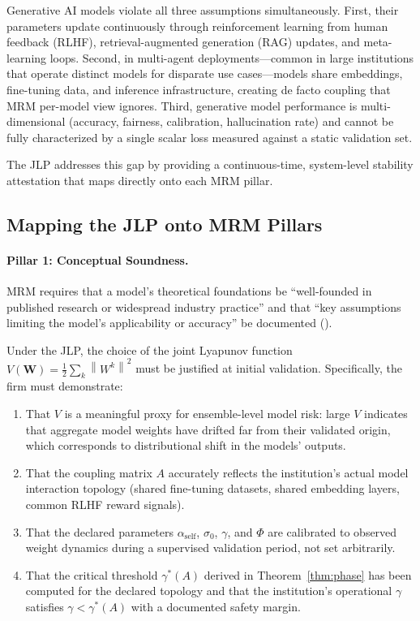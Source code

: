\documentclass[12pt]{article}
\theoremstyle{plain}
\theoremstyle{definition}
\newcommand{\W}{\mathbf{W}}
\newcommand{\norm}[1]{\left\lVert #1 \right\rVert}
\begin{document}
Generative AI models violate all three assumptions simultaneously.
First, their parameters update continuously through reinforcement
learning from human feedback (RLHF), retrieval-augmented generation
(RAG) updates, and meta-learning loops.  Second, in multi-agent
deployments---common in large institutions that operate distinct models for
disparate use cases---models
share embeddings, fine-tuning data, and inference infrastructure,
creating de facto coupling that MRM per-model view ignores.
Third, generative model performance is multi-dimensional (accuracy,
fairness, calibration, hallucination rate) and cannot be fully
characterized by a single scalar loss measured against a static
validation set.

The JLP addresses this gap by providing a continuous-time, system-level
stability attestation that maps directly onto each MRM pillar.

\subsection{Mapping the JLP onto MRM Pillars}

\paragraph{Pillar 1: Conceptual Soundness.}

MRM requires that a model's theoretical foundations be
``well-founded in published research or widespread industry practice''
and that ``key assumptions limiting the model's applicability or
accuracy'' be documented (\cite{sr117}).

Under the JLP, the choice of the joint Lyapunov function
$V(\W) = \tfrac{1}{2}\sum_k \norm{W^k}^2$ must be justified at
initial validation.  Specifically, the firm must demonstrate:

\begin{enumerate}[label=(\roman*)]
  \item That $V$ is a meaningful proxy for ensemble-level model risk:
    large $V$ indicates that aggregate model weights have drifted far
    from their validated origin, which corresponds to distributional
    shift in the models' outputs.

  \item That the coupling matrix $A$ accurately reflects the
    institution's actual model interaction topology (shared fine-tuning
    datasets, shared embedding layers, common RLHF reward signals).

  \item That the declared parameters $\alpha_{\mathrm{self}}$,
    $\sigma_0$, $\gamma$, and $\Phi$ are calibrated to observed weight
    dynamics during a supervised validation period, not set
    arbitrarily.

  \item That the critical threshold $\gamma^*(A)$ derived in
    Theorem~\ref{thm:phase} has been computed for the declared topology
    and that the institution's operational $\gamma$ satisfies
    $\gamma < \gamma^*(A)$ with a documented safety margin.
\end{enumerate}
\end{document}
